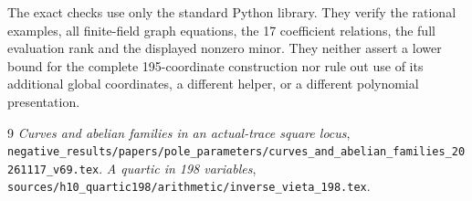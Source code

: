 \documentclass[11pt,a4paper]{article}
\begin{document}
The exact checks use only the standard Python library. They verify
the rational examples, all finite-field graph equations, the 17
coefficient relations, the full evaluation rank and the displayed
nonzero minor. They neither assert a lower bound for the complete
195-coordinate construction nor rule out use of its additional global
coordinates, a different helper, or a different polynomial presentation.

\begin{thebibliography}{9}
\emph{Curves and abelian families in an actual-trace square locus},
\nolinkurl{negative_results/papers/pole_parameters/curves_and_abelian_families_20261117_v69.tex}.
\emph{A quartic in 198 variables},
\nolinkurl{sources/h10_quartic198/arithmetic/inverse_vieta_198.tex}.
\end{thebibliography}
\end{document}
